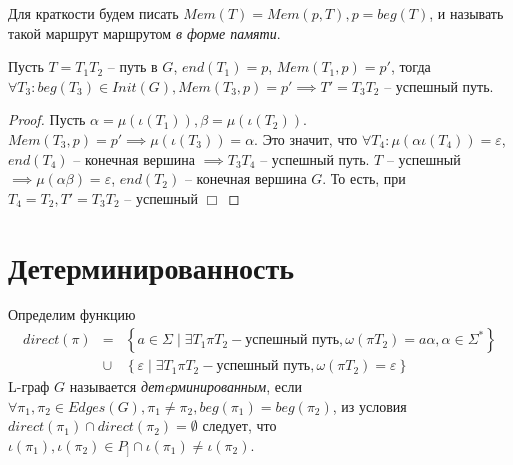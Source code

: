 Для краткости будем писать $Mem(T) = Mem(p, T), p = beg(T)$, и называть такой маршрут маршрутом \emph{в форме памяти}. 

\begin{lemma}
    \label{mem_continue_lemma}
    Пусть $T=T_1 T_2$ -- путь в $G$, $end(T_1) = p$, $Mem(T_1, p) = p'$, тогда $\forall T_3 : beg(T_3) \in Init(G), Mem(T_3, p) = p' \implies T' = T_3 T_2$ -- успешный путь. 
\end{lemma}
\begin{proof}
    Пусть $\alpha = \mu(\iota(T_1)), \beta = \mu(\iota(T_2))$.
    $Mem(T_3, p) = p' \implies \mu(\iota(T_3)) = \alpha$.
    Это значит, что $\forall T_4 : \mu(\alpha \iota(T_4)) = \varepsilon$, $end(T_4)$ -- конечная вершина  $\implies T_3 T_4$ -- успешный путь.
    $T$ -- успешный $\implies \mu(\alpha \beta) = \varepsilon$, $end(T_2)$ -- конечная вершина $G$. 
    То есть, при $T_4 = T_2, T' = T_3 T_2$ -- успешный $\Box$ 
\end{proof}

\section{Детерминированность}
Определим функцию \begin{eqnarray*}
    direct(\pi) & = & \left\{ a \in \Sigma \mid \exists T_1 \pi T_2 - \text{успешный путь}, \omega(\pi T_2) = a \alpha, \alpha \in \Sigma^* \right\} \\
    & \cup & \left\{ \varepsilon \mid \exists T_1 \pi T_2 - \text{успешный путь}, \omega(\pi T_2) = \varepsilon \right\}
\end{eqnarray*}
L-граф $G$ называется \emph{детeрминированным}, если
$\forall \pi_1, \pi_2 \in Edges(G), \pi_1 \neq \pi_2, beg(\pi_1) = beg(\pi_2)$, 
из условия $direct(\pi_1) \cap direct(\pi_2) = \emptyset$ следует, что 
$\iota(\pi_1), \iota(\pi_2) \in P_] \cap \iota(\pi_1) \neq \iota(\pi_2)$. 

\begin{figure}[h]
    \begin{minipage}[h]{0.49\linewidth}
    \end{minipage}
    \hfill
    \begin{minipage}[h]{0.49\linewidth}
    \end{minipage}
    \label{det_vs_nondet}  
  \end{figure}

